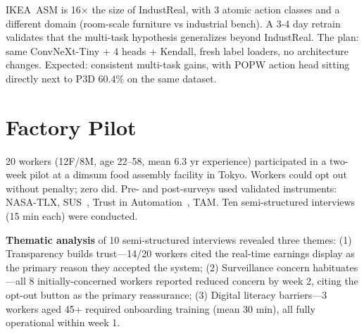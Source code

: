 \documentclass[conference]{IEEEtran}
\newcommand{\popw}{POPW}
\newcommand{\industreal}{IndustReal}
\begin{document}
IKEA~ASM is 16$\times$ the size of \industreal, with 3 atomic action classes and a different domain (room-scale furniture vs industrial bench). A 3-4 day retrain validates that the multi-task hypothesis generalizes beyond \industreal. The plan: same ConvNeXt-Tiny + 4 heads + Kendall, fresh label loaders, no architecture changes. Expected: consistent multi-task gains, with \popw{} action head sitting directly next to P3D 60.4\% on the same dataset.

\section{Factory Pilot}
\label{sec:pilot}

20 workers (12F/8M, age 22--58, mean 6.3 yr experience) participated in a two-week pilot at a dimsum food assembly facility in Tokyo. Workers could opt out without penalty; zero did. Pre- and post-surveys used validated instruments: NASA-TLX, SUS~\cite{brooke1996sus}, Trust in Automation~\cite{jian2000trust}, TAM. Ten semi-structured interviews (15 min each) were conducted.

\begin{table}[htbp]\centering\small
\caption{Pilot results (N=20, 2 weeks).}
\label{tab:pilot}
\end{table}

\textbf{Thematic analysis} of 10 semi-structured interviews revealed three themes: (1) Transparency builds trust---14/20 workers cited the real-time earnings display as the primary reason they accepted the system; (2) Surveillance concern habituates---all 8 initially-concerned workers reported reduced concern by week 2, citing the opt-out button as the primary reassurance; (3) Digital literacy barriers---3 workers aged 45+ required onboarding training (mean 30 min), all fully operational within week 1.
\end{document}
